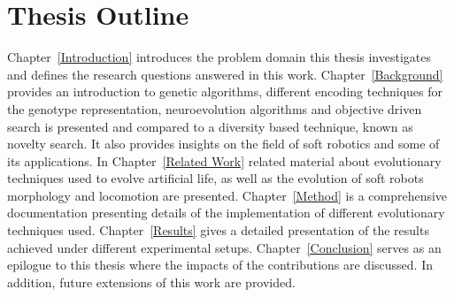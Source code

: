 \section{Thesis Outline}
Chapter~\ref{Introduction} introduces the problem domain this thesis investigates and defines the research questions answered in this work. Chapter~\ref{Background} provides an introduction to genetic algorithms, different encoding techniques for the genotype representation, neuroevolution algorithms and objective driven search is presented and compared to a diversity based technique, known as novelty search. It also provides insights on the field of soft robotics and some of its applications. In Chapter~\ref{Related Work} related material about evolutionary techniques used to evolve artificial life, as well as the evolution of soft robots morphology and locomotion are presented. Chapter~\ref{Method} is a comprehensive documentation presenting details of the implementation of different evolutionary techniques used. Chapter~\ref{Results} gives a detailed presentation of the results achieved under different experimental setups. Chapter~\ref{Conclusion} serves as an epilogue to this thesis where the impacts of the contributions are discussed. In addition, future extensions of this work are provided.






